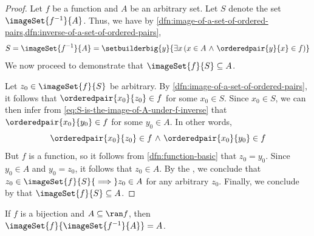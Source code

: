 \begin{proof}
    Let \( f \) be a function and \( A \) be an arbitrary set. Let \( S \) denote the set \( \imageSet{f^{-1}}{A} \).
    Thus, we have by \cref{dfn:image-of-a-set-of-ordered-pairs,dfn:inverse-of-a-set-of-ordered-pairs},
    \begin{equation}
        \label{eq:S-is-the-image-of-A-under-f-inverse}
        S = \imageSet{f^{-1}}{A} = \setbuilderbig{y}{\exists x \, \mleft( x \in A \,\,{\land}\,\, \orderedpair{y}{x} \in f \mright)}
    \end{equation}
    We now proceed to demonstrate that \( \imageSet{f}{S} \subseteq A \).

    \vspace{0.3cm}
    \noindent
    Let \( z_{0} \in \imageSet{f}{S} \) be arbitrary. By \cref{dfn:image-of-a-set-of-ordered-pairs}, it follows that \( \orderedpair{x_{0}}{z_{0}} \in f \)
    for some \( x_{0} \in S \).
    Since \( x_{0} \in S \), we can then infer from \eqref{eq:S-is-the-image-of-A-under-f-inverse} that \( \orderedpair{x_{0}}{y_{0}} \in f \) for some
    \( y_{0} \in A \). In other words,
    \begin{equation*}
        \orderedpair{x_{0}}{z_{0}} \in f \,\,{\land}\,\, \orderedpair{x_{0}}{y_{0}} \in f
    \end{equation*}
    But \( f \) is a function, so it follows from \cref{dfn:function-basic} that \( z_{0} = y_{0} \). Since \( y_{0} \in A \) and \( y_{0} = z_{0} \),
    it follows that \( z_{0} \in A \). By the ,
    we conclude that \( z_{0} \in \imageSet{f}{S} {\implies} z_{0} \in A \) for any arbitrary \( z_{0} \).
    Finally, we conclude by  that \( \imageSet{f}{S} \subseteq A \).
\end{proof}

\begin{thm}
     \label{thm:image-of-f-inverse-A-under-f-is-A-if-f-is-a-bijection-and-A-subset-of-range-f}
    If \( f \) is a bijection and \( A \subseteq \ran f \), then \( \imageSet{f}{\imageSet{f^{-1}}{A}} = A \).
\end{thm}


